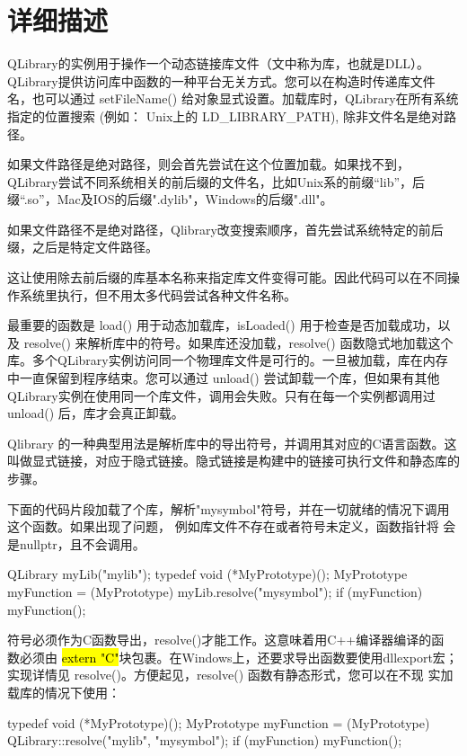 \section{详细描述}

QLibrary的实例用于操作一个动态链接库文件（文中称为库，也就是DLL）。QLibrary提供访问库中函数的一种平台无关方式。您可以在构造时传递库文件名，也可以通过 setFileName() 给对象显式设置。加载库时，QLibrary在所有系统指定的位置搜索 (例如： Unix上的 LD\_LIBRARY\_PATH), 除非文件名是绝对路径。

如果文件路径是绝对路径，则会首先尝试在这个位置加载。如果找不到，QLibrary尝试不同系统相关的前后缀的文件名，比如Unix系的前缀“lib”，后缀“.so”，Mac及IOS的后缀".dylib"，Windows的后缀".dll"。

如果文件路径不是绝对路径，Qlibrary改变搜索顺序，首先尝试系统特定的前后缀，之后是特定文件路径。

这让使用除去前后缀的库基本名称来指定库文件变得可能。因此代码可以在不同操作系统里执行，但不用太多代码尝试各种文件名称。

最重要的函数是 load() 用于动态加载库，isLoaded() 用于检查是否加载成功，以及 resolve() 来解析库中的符号。如果库还没加载，resolve() 函数隐式地加载这个库。多个QLibrary实例访问同一个物理库文件是可行的。一旦被加载，库在内存中一直保留到程序结束。您可以通过 unload() 尝试卸载一个库，但如果有其他QLibrary实例在使用同一个库文件，调用会失败。只有在每一个实例都调用过 unload() 后，库才会真正卸载。

Qlibrary 的一种典型用法是解析库中的导出符号，并调用其对应的C语言函数。这叫做显式链接，对应于隐式链接。隐式链接是构建中的链接可执行文件和静态库的步骤。

下面的代码片段加载了个库，解析"mysymbol"符号，并在一切就绪的情况下调用
这个函数。如果出现了问题， 例如库文件不存在或者符号未定义，函数指针将
会是nullptr，且不会调用。

\begin{cppcode}
QLibrary myLib("mylib");
typedef void (*MyPrototype)();
MyPrototype myFunction = (MyPrototype) myLib.resolve("mysymbol");
if (myFunction)
    myFunction();
\end{cppcode}

符号必须作为C函数导出，resolve()才能工作。这意味着用C++编译器编译的函
数必须由 \hl{extern "C"}块包裹。在Windows上，还要求导出函数要使用dllexport宏；
实现详情见 resolve()。方便起见，resolve() 函数有静态形式，您可以在不现
实加载库的情况下使用：


\begin{cppcode}
typedef void (*MyPrototype)();
MyPrototype myFunction =
        (MyPrototype) QLibrary::resolve("mylib", "mysymbol");
if (myFunction)
    myFunction();
\end{cppcode}

